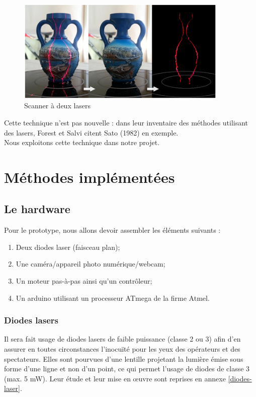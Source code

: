 \documentclass[a4paper,10pt]{report}
\begin{document}
\begin{figure}[h!]
\centering
\includegraphics[width=0.9\textwidth]{laser_scanner.png}
\caption{Scanner à deux lasers\cite{rubicon}}
\label{laser_scanner}
\end{figure}
Cette technique n'est pas nouvelle : dans leur inventaire des méthodes utilisant des lasers, Forest et Salvi\cite{forest2002,forest2004} citent Sato (1982)\cite{sato} en exemple.\\
Nous exploitons cette technique dans notre projet.

\chapter{Méthodes implémentées}
\section{Le hardware}
Pour le prototype, nous allons devoir assembler les éléments suivants :
\begin{enumerate}
\item Deux diodes laser (faisceau plan);
\item Une caméra/appareil photo numérique/webcam;
\item Un moteur pas-à-pas ainsi qu'un contrôleur;
\item Un arduino utilisant un processeur ATmega de la firme Atmel\cite{ATmega}.
\end{enumerate}
\subsection{Diodes lasers}
Il sera fait usage de diodes lasers de faible puissance (classe 2 ou 3) afin d'en assurer en toutes circonstances l'inocu\"{i}té pour les yeux des opérateurs et des spectateurs. Elles sont pourvues d'une lentille projetant la lumière émise sous forme d'une ligne et non d'un point, ce qui permet l'usage de diodes de classe 3 (max. 5 mW).
Leur étude et leur mise en \oe uvre sont reprises en annexe \ref{diodes-laser}.
\end{document}

